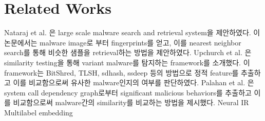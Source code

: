 \section{Related Works}
Nataraj et al. 은 large scale malware search and retrieval system을 제안하였다. 이 논문에서는 malware image로 부터 fingerprints를 얻고, 이를 nearest neighbor search를 통해 비슷한 샘플을 retrieval하는 방법을 제안하였다. Upchurch et al. 은 similarity testing을 통해 variant malware를 탐지하는 framework를 소개했다. 이 framework는 BitShred, TLSH, sdhash, ssdeep 등의 방법으로 정적 feature를 추출하고 이를 비교함으로써 유사한 malware인지의 여부를 판단하였다. Palahan et al. 은 system call dependency graph로부터 significant malicious behaviors를 추출하고 이를 비교함으로써 malware간의 similarity를 비교하는 방법을 제시했다. 
Neural IR
Multilabel embedding


